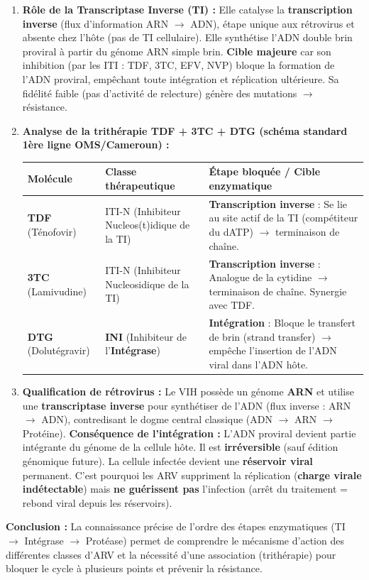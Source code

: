 \documentclass[11pt]{article}
\begin{document}
\begin{exoresolu}
\begin{enumerate}
    7. \textbf{Maturation} : Clivage des polyprotéines par la \textbf{protéase (PR)} $\rightarrow$ \textbf{Virion mature infectieux}.
    \item \textbf{Rôle de la Transcriptase Inverse (TI) :} Elle catalyse la \textbf{transcription inverse} (flux d'information ARN $\rightarrow$ ADN), étape unique aux rétrovirus et absente chez l'hôte (pas de TI cellulaire). Elle synthétise l'ADN double brin proviral à partir du génome ARN simple brin. \textbf{Cible majeure} car son inhibition (par les ITI : TDF, 3TC, EFV, NVP) bloque la formation de l'ADN proviral, empêchant toute intégration et réplication ultérieure. Sa fidélité faible (pas d'activité de relecture) génère des mutations $\rightarrow$ résistance.
    \item \textbf{Analyse de la trithérapie TDF + 3TC + DTG (schéma standard 1ère ligne OMS/Cameroun) :}
    \begin{center}
    \begin{tabularx}{\linewidth}{|l|X|X|}\hline
    \rowcolor{popblueL} \textbf{Molécule} & \textbf{Classe thérapeutique} & \textbf{Étape bloquée / Cible enzymatique} \\ \hline
    \textbf{TDF} (Ténofovir) & ITI-N (Inhibiteur Nucleos(t)idique de la TI) & \textbf{Transcription inverse} : Se lie au site actif de la TI (compétiteur du dATP) $\rightarrow$ terminaison de chaîne. \\ \hline
    \textbf{3TC} (Lamivudine) & ITI-N (Inhibiteur Nucleosidique de la TI) & \textbf{Transcription inverse} : Analogue de la cytidine $\rightarrow$ terminaison de chaîne. Synergie avec TDF. \\ \hline
    \textbf{DTG} (Dolutégravir) & \textbf{INI} (Inhibiteur de l'\textbf{Intégrase}) & \textbf{Intégration} : Bloque le transfert de brin (strand transfer) $\rightarrow$ empêche l'insertion de l'ADN viral dans l'ADN hôte. \\ \hline
    \end{tabularx}
    \end{center}
    \item \textbf{Qualification de rétrovirus :} Le VIH possède un génome \textbf{ARN} et utilise une \textbf{transcriptase inverse} pour synthétiser de l'ADN (flux inverse : ARN $\rightarrow$ ADN), contredisant le dogme central classique (ADN $\rightarrow$ ARN $\rightarrow$ Protéine).
    \textbf{Conséquence de l'intégration :} L'ADN proviral devient partie intégrante du génome de la cellule hôte. Il est \textbf{irréversible} (sauf édition génomique future). La cellule infectée devient une \textbf{réservoir viral} permanent. C'est pourquoi les ARV suppriment la réplication (\textbf{charge virale indétectable}) mais \textbf{ne guérissent pas} l'infection (arrêt du traitement = rebond viral depuis les réservoirs).
\end{enumerate}
\textbf{Conclusion :} La connaissance précise de l'ordre des étapes enzymatiques (TI $\rightarrow$ Intégrase $\rightarrow$ Protéase) permet de comprendre le mécanisme d'action des différentes classes d'ARV et la nécessité d'une association (trithérapie) pour bloquer le cycle à plusieurs points et prévenir la résistance.
\end{exoresolu}
\end{document}
